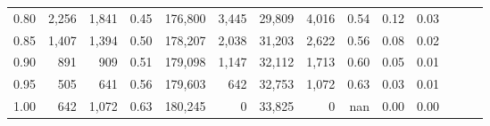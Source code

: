 \begin{tabular}{rrrrrrrrrrrrrr}
0.80 &   2,256 &  1,841 &  0.45 &  176,800 &    3,445 &  29,809 &   4,016 &  0.54 &  0.12 &      0.03 \\
0.85 &   1,407 &  1,394 &  0.50 &  178,207 &    2,038 &  31,203 &   2,622 &  0.56 &  0.08 &      0.02 \\
0.90 &     891 &    909 &  0.51 &  179,098 &    1,147 &  32,112 &   1,713 &  0.60 &  0.05 &      0.01 \\
0.95 &     505 &    641 &  0.56 &  179,603 &      642 &  32,753 &   1,072 &  0.63 &  0.03 &      0.01 \\
1.00 &     642 &  1,072 &  0.63 &  180,245 &        0 &  33,825 &       0 &   nan &  0.00 &      0.00 \\
\bottomrule
\end{tabular}
